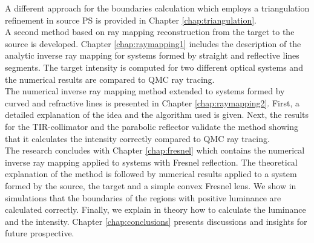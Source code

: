 A different approach for the boundaries calculation which employs a triangulation refinement in source PS is provided in Chapter \ref{chap:triangulation}.  
\\ \indent A second method based on ray mapping reconstruction from the target to the source is developed. Chapter \ref{chap:raymapping1} includes the description of the analytic inverse ray mapping for systems formed by straight and reflective lines segments. The target intensity is computed for two different optical systems and the numerical results are compared to QMC ray tracing. \\ \indent The numerical inverse ray mapping method extended to systems formed by curved and refractive lines is presented in
Chapter \ref{chap:raymapping2}. First, a detailed explanation of the idea and the algorithm used is given. Next, the results for the TIR-collimator and the parabolic reflector validate the method showing that it calculates the intensity correctly compared to QMC ray tracing. \\ \indent
The research concludes with Chapter \ref{chap:fresnel} which contains the numerical inverse ray mapping applied to systems with Fresnel reflection. The theoretical explanation of the method is followed by numerical results applied to a system formed by the source, the target and a simple convex Fresnel lens. We show in simulations that the boundaries of the regions with positive luminance are calculated correctly. Finally, we explain in theory how to calculate the luminance and the intensity. Chapter \ref{chap:conclusions} presents discussions and insights for future prospective.
\clearpage{\pagestyle{empty}\cleardoublepage}
 